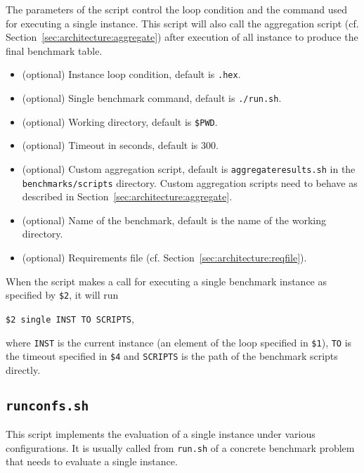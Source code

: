 \documentclass[a4paper]{article}
\begin{document}
		    The parameters of the script control the loop condition
		    and the command used for executing a single instance.
		    This script will also call the aggregation script (cf. Section~\ref{sec:architecture:aggregate})
		    after execution of all instance
		    to produce the final benchmark table.
				
		    \medskip{}
		    \begin{itemize}
				\item[{\tt \$1}:] (optional) Instance loop condition, default is {\tt *.hex}.
				\item[{\tt \$2}:] (optional) Single benchmark command, default is {\tt ./run.sh}.
				\item[{\tt \$3}:] (optional) Working directory, default is {\tt \$PWD}.
				\item[{\tt \$4}:] (optional) Timeout in seconds, default is {\tt $300$}.
				\item[{\tt \$5}:] (optional) Custom aggregation script, default is {\tt aggregateresults.sh}
					in the {\tt benchmarks/scripts} directory.
					Custom aggregation scripts need to behave as described in Section~\ref{sec:architecture:aggregate}.
				\item[{\tt \$6}:] (optional) Name of the benchmark, default is the name of the working directory.
				\item[{\tt \$7}:] (optional) Requirements file (cf. Section~\ref{sec:architecture:reqfile}).
		    \end{itemize}
		 
		 	When the script makes a call for executing a single benchmark instance
		 	as specified by {\tt \$2}, it will run
		 	\begin{center}
		 		{\tt \$2 single INST TO SCRIPTS},
		 	\end{center}
		 	where {\tt INST} is the current instance (an element of the loop specified in {\tt \$1}),
		 	{\tt TO} is the timeout specified in {\tt \$4}
		 	and {\tt SCRIPTS} is the path of the benchmark scripts directly.
				
		\subsection{\tt runconfs.sh}
		\label{sec:architecture:runconfs}
		
		    This script implements the evaluation of
		    a single instance under various configurations.
		    It is usually called from {\tt run.sh} of a concrete benchmark problem
		    that needs to evaluate a single instance.
		
\end{document}
